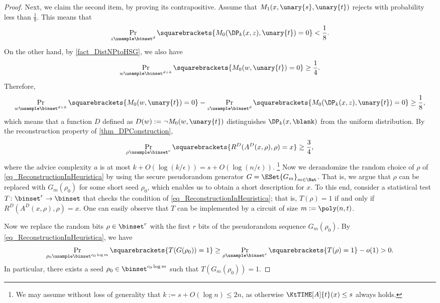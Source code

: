 \documentclass[11pt]{article}
\numberwithin{equation}{section}
\theoremstyle{definition}
\theoremstyle{plain}
\begin{document}
\begin{proof}
  Next, we claim the second item, by proving its contrapositive.
  Assume that $M_1(x, \unary{s}, \unary{t})$ rejects with probability less than $\frac{1}{8}$.
  This means that
  $$
    \Pr_{{z} \usample \binset^d} \squarebrackets{ M_0(\DP_k(x, {z}), \unary{t}) = 0 } < \frac{1}{8}.
  $$
  On the other hand, by \cref{fact_DistNPtoHSG}, we also have
  $$
    \Pr_{w \usample \binset^{d+k}} \squarebrackets{ M_0(w, \unary{t}) = 0 } \ge \frac{1}{4}.
  $$
  Therefore,
  $$
    \Pr_{w \usample \binset^{d+k}} \squarebrackets{ M_0(w, \unary{t}) = 0 }
    -
    \Pr_{{z} \usample \binset^d} \squarebrackets{ M_0(\DP_k(x, {z}), \unary{t}) = 0 }
    \ge \frac{1}{8},
  $$
  which means that a function $D$ defined as $D(w) := \neg M_0(w, \unary{t})$ distinguishes $\DP_k(x, \blank)$ from the uniform distribution.
  By the reconstruction property of \cref{thm_DPConstruction},
  \begin{align}
    \label{eq_ReconstructionInHeuristica}
    \Pr_{\rho \usample \binset^r} \squarebrackets{ R^D(A^D(x, \rho), \rho) = x } \ge \frac{3}{4},
  \end{align}
  where the advice complexity $a$ is at most $k + O(\log (k / \epsilon)) = s + O(\log (n / \epsilon))$.%
  \footnote{We may assume without loss of generality that $k := s + O(\log n) \le 2 n$,
    as otherwise $\KtTIME[A]{t}(x) \le s$ always holds. }
  Now we derandomize the random choice of $\rho$ of \cref{eq_ReconstructionInHeuristica}
  by using the secure pseudorandom generator $G = \ESet{G_m}_{m \in \Nat}$.
  That is,
  we argue that $\rho$ can be replaced with $G_m(\rho_0)$ for some short seed $\rho_0$,
  which enables us to obtain a short description for $x$.
  To this end, consider a statistical test $T \colon \binset^r \to \binset$ that checks the condition of \cref{eq_ReconstructionInHeuristica}; that is,
  $T(\rho) = 1$ if and only if $R^D(A^D(x, \rho), \rho) = x$.
  One can easily observe that $T$ can be implemented by a circuit of size $m := \poly(n, t)$.


  Now we replace the random bits $\rho \in \binset^r$ with the first $r$ bits of the pseudorandom sequence $G_m(\rho_0)$.
  By \cref{eq_ReconstructionInHeuristica},
  we have
  $$
    \Pr_{\rho_0 \usample \binset^{c_0 \log m}} \squarebrackets{ T(G(\rho_0)) = 1 } \ge
    \Pr_{\rho \usample \binset^r} \squarebrackets{ T(\rho) = 1 } - o(1) > 0.
  $$
  In particular, there exists a seed $\rho_0 \in \binset^{c_0 \log m}$
  such that $T(G_m(\rho_0)) = 1$.


\end{proof}
\end{document}
